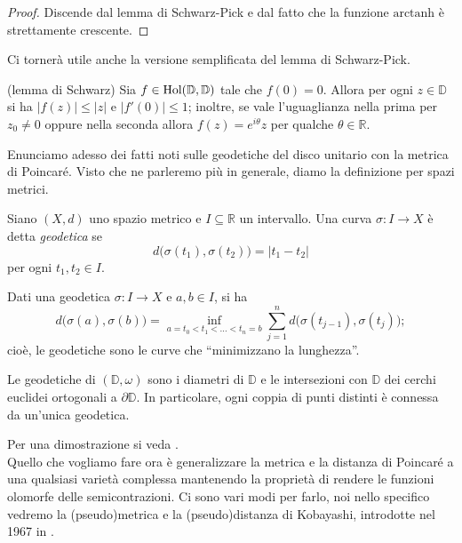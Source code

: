 \begin{proof}
    Discende dal lemma di Schwarz-Pick e dal fatto che la funzione $\text{arctanh}$ è strettamente crescente.
\end{proof}

Ci tornerà utile anche la versione semplificata del lemma di Schwarz-Pick.

\begin{lm}
    (lemma di Schwarz) Sia $f\in\textnormal{Hol}(\mathbb{D},\mathbb{D})$ tale che $f(0)=0$. Allora per ogni $z\in\mathbb{D}$ si ha $|f(z)| \le |z|$ e $|f'(0)| \le 1$; inoltre, se vale l'uguaglianza nella prima per $z_0\not=0$ oppure nella seconda allora $f(z)=e^{i\theta}z$ per qualche $\theta\in\mathbb{R}$.
\end{lm}

Enunciamo adesso dei fatti noti sulle geodetiche del disco unitario con la metrica di Poincaré. Visto che ne parleremo più in generale, diamo la definizione per spazi metrici.

\begin{defn}
    Siano $(X,d)$ uno spazio metrico e $I\subseteq\mathbb{R}$ un intervallo. Una curva $\sigma:I\longrightarrow X$ è detta \textit{geodetica} se
    $$d\big(\sigma(t_1),\sigma(t_2)\big)=|t_1-t_2|$$
    per ogni $t_1,t_2\in I$.
\end{defn}

\begin{oss}
    Dati una geodetica $\sigma:I\longrightarrow X$ e $a,b\in I$, si ha
    $$d\big(\sigma(a),\sigma(b)\big)=\inf_{a=t_0<t_1<\dots<t_n=b} \sum_{j=1}^n d\big(\sigma(t_{j-1}),\sigma(t_j)\big);$$
    cioè, le geodetiche sono le curve che ``minimizzano la lunghezza''.
\end{oss}

\begin{prop}
    Le geodetiche di $(\mathbb{D},\omega)$ sono i diametri di $\mathbb{D}$ e le intersezioni con $\mathbb{D}$ dei cerchi euclidei ortogonali a $\partial\mathbb{D}$. In particolare, ogni coppia di punti distinti è connessa da un'unica geodetica.
\end{prop}

Per una dimostrazione si veda \cite[point (iv) of Proposition 1.2.7]{A5}.\\

Quello che vogliamo fare ora è generalizzare la metrica e la distanza di Poincaré a una qualsiasi varietà complessa mantenendo la proprietà di rendere le funzioni olomorfe delle semicontrazioni. Ci sono vari modi per farlo, noi nello specifico vedremo la (pseudo)metrica e la (pseudo)distanza di Kobayashi, introdotte nel 1967 in \cite{Ko1}.

